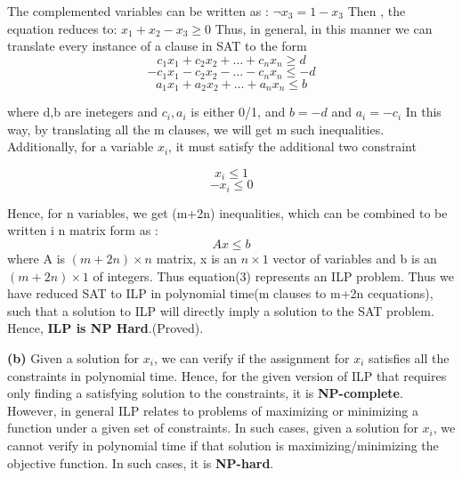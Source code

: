 \documentclass{article}
\renewcommand\part[1]{\vspace{.10in}\textbf{(#1)}}
\begin{document}
The complemented variables can be written as :\newline
\hspace*{1cm} $\neg x_{3} = 1 - x_{3}$ \newline
Then , the equation reduces to: \newline
\hspace*{1cm} $x_{1} + x_{2} - x_{3} \geq 0$ \newline
Thus, in general, in this manner we can translate every instance of a clause in SAT to the form \newline
  \[c_{1}x_{1} + c_{2}x_{2} + \dots + c_{n}x_{n} \geq d\]
  \[-c_{1}x_{1} - c_{2}x_{2} - \dots - c_{n}x_{n} \leq -d\]
  \[a_{1}x_{1} + a_{2}x_{2} + \dots + a_{n}x_{n} \leq b\]

where d,b are inetegers and $c_{i},a_{i}$ is either 0/1, and $b = -d$ and $a_{i} = -c_{i}$ \newline
In this way, by translating all the m clauses, we will get m such inequalities. Additionally, for a variable $x_{i}$, it must satisfy the additional two constraint 

\[x_{i} \leq 1\]
\[-x_{i} \leq 0\]

Hence, for n variables, we get (m+2n) inequalities, which can be combined to be written  i n matrix form as : \newline
\begin{equation}
   Ax \leq b
\end{equation}
where A is $(m+2n) \times n$ matrix, x is an $n \times 1$ vector of variables and b is an $(m+2n) \times 1$ of integers. Thus equation(3) represents an ILP problem. \newline
Thus we have reduced SAT to ILP in polynomial time(m clauses to m+2n cequations), such that a solution to ILP will directly imply a solution to the SAT problem. Hence, \textbf {ILP is NP Hard}.(Proved). \newline

\part{b}
Given a solution for $x_{i}$, we can verify if the assignment for $x_{i}$ satisfies all the constraints in polynomial time. Hence, for the given version of ILP that requires only finding a satisfying solution to the constraints, it is \textbf {NP-complete}. However, in general ILP relates to problems of maximizing or minimizing a function under a given set of constraints. In such cases, given a solution for $x_{i}$, we cannot verify in polynomial time if that solution is maximizing/minimizing the objective function. In such cases, it is \textbf {NP-hard}. \newline
\end{document}
